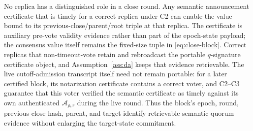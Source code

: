 \documentclass[11pt]{article}
\theoremstyle{definition}
\theoremstyle{remark}
\begin{document}
\begin{description}[leftmargin=2.4em,labelindent=0em]
\item[C4 (no proposer and retained certificate evidence).]
No replica has a distinguished role in a close round. Any semantic announcement certificate that is timely for a correct replica under C2 can enable the value bound to its previous-close/parent/root triple at that replica. The certificate is auxiliary pre-vote validity evidence rather than part of the epoch-state payload; the consensus value itself remains the fixed-size tuple in \eqref{eq:close-block}. Correct replicas that non-timeout-vote retain and rebroadcast the portable $q$-signature certificate object, and Assumption~\ref{ass:da} keeps that evidence retrievable. The live cutoff-admission transcript itself need not remain portable: for a later certified block, its notarization certificate contains a correct voter, and C2--C3 guarantee that this voter verified the semantic certificate as timely against its own authenticated $\mathcal A_{\rho,r}$ during the live round. Thus the block's epoch, round, previous-close hash, parent, and target identify retrievable semantic quorum evidence without enlarging the target-state commitment.
\end{description}
\end{document}
